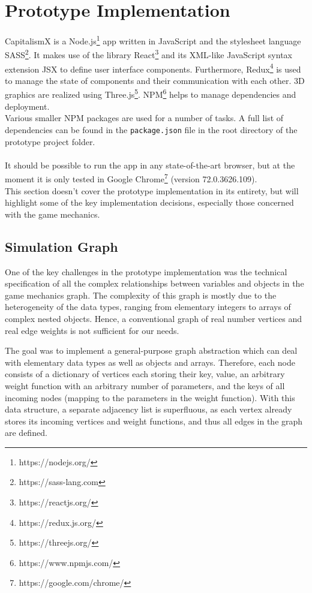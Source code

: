 \section{Prototype Implementation}
CapitalismX is a Node.js\footnote{https://nodejs.org/} app written in JavaScript and the stylesheet language SASS\footnote{https://sass-lang.com}. It makes use of the library React\footnote{https://reactjs.org/} and its XML-like JavaScript syntax extension JSX to define user interface components. Furthermore, Redux\footnote{https://redux.js.org/} is used to manage the state of components and their communication with each other. 3D graphics are realized using Three.js\footnote{https://threejs.org/}. NPM\footnote{https://www.npmjs.com/} helps to manage dependencies and deployment.
\\
Various smaller NPM packages are used for a number of tasks. A full list of dependencies can be found in the \texttt{package.json} file in the root directory of the prototype project folder.\\\\
It should be possible to run the app in any state-of-the-art browser, but at the moment it is only tested in Google Chrome\footnote{https://google.com/chrome/} (version 72.0.3626.109).
\\
This section doesn't cover the prototype implementation in its entirety, but will highlight some of the key implementation decisions, especially those concerned with the game mechanics.

\subsection{Simulation Graph}

One of the key challenges in the prototype implementation was the technical specification of all the complex relationships between variables and objects in the game mechanics graph. The complexity of this graph is mostly due to the heterogeneity of the data types, ranging from elementary integers to arrays of complex nested objects. 
 Hence, a conventional graph of real number vertices and real edge weights is not sufficient for our needs.
 
 
The goal was to implement a general-purpose graph abstraction which can deal with elementary data types as well as objects and arrays.
Therefore, each node consists of a dictionary of vertices each storing their key, value, an arbitrary weight function with an arbitrary number of parameters, and the keys of all incoming nodes (mapping to the parameters in the weight function). With this data structure, a separate adjacency list is superfluous, as each vertex already stores its incoming vertices and weight functions, and thus all edges in the graph are defined.


